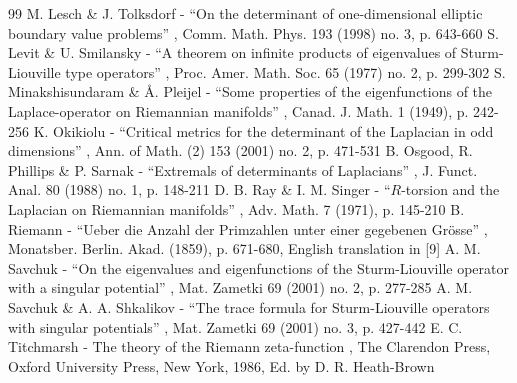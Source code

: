 \documentclass[11pt]{article}
\theoremstyle{plain}
\theoremstyle{definition}
\begin{document}
\begin{thebibliography}{99}
 M. Lesch \& J. Tolksdorf - “On the determinant of one-dimensional elliptic boundary value problems” , Comm. Math. Phys. 193 (1998) no. 3, p. 643-660
 S. Levit \& U. Smilansky - “A theorem on infinite products of eigenvalues of Sturm-Liouville type operators” , Proc. Amer. Math. Soc. 65 (1977) no. 2, p. 299-302
 S. Minakshisundaram \& Å. Pleijel - “Some properties of the eigenfunctions of the Laplace-operator on Riemannian manifolds” , Canad. J. Math. 1 (1949), p. 242-256
 K. Okikiolu - “Critical metrics for the determinant of the Laplacian in odd dimensions” , Ann. of Math. (2) 153 (2001) no. 2, p. 471-531
 B. Osgood, R. Phillips \& P. Sarnak - “Extremals of determinants of Laplacians” , J. Funct. Anal. 80 (1988) no. 1, p. 148-211
 D. B. Ray \& I. M. Singer - “$R$-torsion and the Laplacian on Riemannian manifolds” , Adv. Math. 7 (1971), p. 145-210
 B. Riemann - “Ueber die Anzahl der Primzahlen unter einer gegebenen Grösse” , Monatsber. Berlin. Akad. (1859), p. 671-680, English translation in [9]
 A. M. Savchuk - “On the eigenvalues and eigenfunctions of the Sturm-Liouville operator with a singular potential” , Mat. Zametki 69 (2001) no. 2, p. 277-285
 A. M. Savchuk \& A. A. Shkalikov - “The trace formula for Sturm-Liouville operators with singular potentials” , Mat. Zametki 69 (2001) no. 3, p. 427-442
 E. C. Titchmarsh - The theory of the Riemann zeta-function , The Clarendon Press, Oxford University Press, New York, 1986, Ed. by D. R. Heath-Brown
\end{thebibliography}
\end{document}
